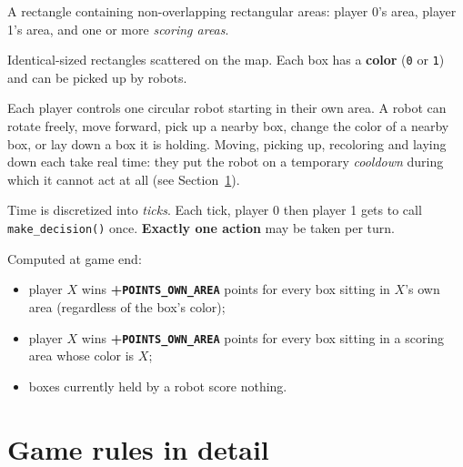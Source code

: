\documentclass[11pt,a4paper]{article}
\newcommand{\code}[1]{\texttt{#1}}
\newcommand{\func}[1]{\texttt{#1}}
\begin{document}
\begin{description}[leftmargin=1.2cm,style=nextline]
    \item[The map] A rectangle containing non-overlapping rectangular areas:
        player 0's area, player 1's area, and one or more \emph{scoring
        areas}.
    \item[Boxes] Identical-sized rectangles scattered on the map. Each box
        has a \textbf{color} (\code{0} or \code{1}) and can be picked up by robots.
    \item[Robots] Each player controls one circular robot starting in their
        own area. A robot can rotate freely, move forward, pick up a nearby box,
        change the color of a nearby box, or lay down a box it is holding.
        Moving, picking up, recoloring and laying down each take real time:
        they put the robot on a temporary \emph{cooldown} during which it
        cannot act at all (see Section~\ref{sec:one-action}).
    \item[Turns] Time is discretized into \emph{ticks}. Each tick, player 0
        then player 1 gets to call \func{make\_decision()} once.
        \textbf{Exactly one action} may be taken per turn.
    \item[Scoring] Computed at game end:
        \begin{itemize}[nosep]
            \item player $X$ wins \textbf{+\code{POINTS\_OWN\_AREA}} points for every 
                  box sitting in $X$'s own area (regardless of the box's color);
            \item player $X$ wins \textbf{+\code{POINTS\_OWN\_AREA}} points for every 
                  box sitting in a scoring area whose color is $X$;
            \item boxes currently held by a robot score nothing.
        \end{itemize}
\end{description}

\section{Game rules in detail}
\label{sec:one-action}
\end{document}
